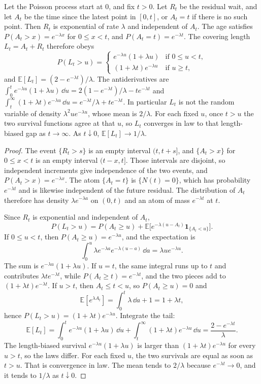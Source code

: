 \begin{proposition}\label{prop:onesidedgap}
Let the Poisson process start at $0$, and fix $t>0$. Let $R_t$ be the residual wait, and let $A_t$ be the time since the latest point in $[0,t]$, or $A_t=t$ if there is no such point. Then $R_t$ is exponential of rate $\lambda$ and independent of $A_t$. The age satisfies $P(A_t>x)=e^{-\lambda x}$ for $0\le x<t$, and $P(A_t=t)=e^{-\lambda t}$. The covering length $L_t=A_t+R_t$ therefore obeys
\[
 P(L_t>u)=
 \begin{cases}
 e^{-\lambda u}(1+\lambda u) & \text{if }0\le u<t,\\
 (1+\lambda t)e^{-\lambda u} & \text{if }u\ge t,
 \end{cases}
\]
and $\mathbb E[L_t]=(2-e^{-\lambda t})/\lambda$. The antiderivatives are $\int_0^t e^{-\lambda u}(1+\lambda u)\,\dd u=2(1-e^{-\lambda t})/\lambda-te^{-\lambda t}$ and $\int_t^\infty(1+\lambda t)e^{-\lambda u}\,\dd u=e^{-\lambda t}/\lambda+te^{-\lambda t}$. In particular $L_t$ is not the random variable of density $\lambda^2 u e^{-\lambda u}$, whose mean is $2/\lambda$. For each fixed $u$, once $t>u$ the two survival functions agree at that $u$, so $L_t$ converges in law to that length-biased gap as $t\to\infty$. As $t\downarrow0$, $\mathbb E[L_t]\to1/\lambda$.
\end{proposition}
\begin{proof}
The event $\{R_t>s\}$ is an empty interval $(t,t+s]$, and $\{A_t>x\}$ for $0\le x<t$ is an empty interval $(t-x,t]$. Those intervals are disjoint, so independent increments give independence of the two events, and $P(A_t>x)=e^{-\lambda x}$. The atom $\{A_t=t\}$ is $\{N(t)=0\}$, which has probability $e^{-\lambda t}$ and is likewise independent of the future residual. The distribution of $A_t$ therefore has density $\lambda e^{-\lambda a}$ on $(0,t)$ and an atom of mass $e^{-\lambda t}$ at $t$.

Since $R_t$ is exponential and independent of $A_t$,
\[
 P(L_t>u)=P(A_t\ge u)+\mathbb E\bigl[e^{-\lambda(u-A_t)}\mathbf 1_{\{A_t<u\}}\bigr].
\]
If $0\le u<t$, then $P(A_t\ge u)=e^{-\lambda u}$, and the expectation is
\[
 \int_0^u \lambda e^{-\lambda a}e^{-\lambda(u-a)}\,\dd a=\lambda u e^{-\lambda u}.
\]
The sum is $e^{-\lambda u}(1+\lambda u)$. If $u=t$, the same integral runs up to $t$ and contributes $\lambda t e^{-\lambda t}$, while $P(A_t\ge t)=e^{-\lambda t}$, and the two pieces add to $(1+\lambda t)e^{-\lambda t}$. If $u>t$, then $A_t\le t<u$, so $P(A_t\ge u)=0$ and
\[
 \mathbb E[e^{\lambda A_t}]=\int_0^t\lambda\,\dd a+1=1+\lambda t,
\]
hence $P(L_t>u)=(1+\lambda t)e^{-\lambda u}$. Integrate the tail:
\[
 \mathbb E[L_t]=\int_0^t e^{-\lambda u}(1+\lambda u)\,\dd u+\int_t^\infty(1+\lambda t)e^{-\lambda u}\,\dd u=\frac{2-e^{-\lambda t}}{\lambda}.
\]
The length-biased survival $e^{-\lambda u}(1+\lambda u)$ is larger than $(1+\lambda t)e^{-\lambda u}$ for every $u>t$, so the laws differ. For each fixed $u$, the two survivals are equal as soon as $t>u$. That is convergence in law. The mean tends to $2/\lambda$ because $e^{-\lambda t}\to0$, and it tends to $1/\lambda$ as $t\downarrow0$.
\end{proof}

